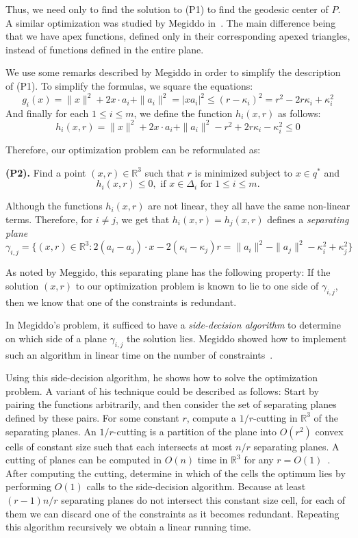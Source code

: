 \documentclass[a4paper,UKenglish]{lipics}
\begin{document}
Thus, we need only to find the solution to (P1) to find the geodesic center of $P$.
A similar optimization was studied by Megiddo in~\cite{megiddo1989ball}. 
The main difference being that we have apex functions, defined only in their corresponding apexed triangles, instead of functions defined in the entire plane. 

We use some remarks described by Megiddo in order to simplify the description of (P1).
To simplify the formulas, we square the equations:
$$g_i(x) = \|x\|^2 + 2x\cdot a_i + \|a_i\|^2  = |x a_i|^2 \leq (r - \kappa_i)^2 = r^2 - 2r\kappa_i + \kappa_i^2$$ 
And finally for each $1\leq i\leq m$, we define the function $h_i(x, r)$ as follows:
$$h_i(x, r) = \|x\|^2 + 2x\cdot a_i + \|a_i\|^2  - r^2 + 2r\kappa_i - \kappa_i^2 \leq 0$$

Therefore, our optimization problem can be reformulated as:

\textbf{(P2).} Find a point $(x,r)\in \mathbb{R}^3$ such that $r$ is minimized subject to $x\in q^*$ and 
$$h_i(x, r) \leq 0, \text{ if $x\in \Delta_{i}$ for $1\leq i \leq m$}.$$%

Although the functions $h_i(x,r)$ are not linear, they all have the same non-linear terms. Therefore, for $i\neq j$, we get that
$h_i(x,r) = h_j(x, r)$ defines a \emph{separating plane}
$$\gamma_{i,j} = \{(x, r) \in \mathbb{R}^3: 2 (a_i - a_j) \cdot x - 2( \kappa_i - \kappa_j) r = \|a_i\|^2 - \|a_j\|^2 - \kappa_i^2 + \kappa_j^2\}$$

As noted by Meggido, this separating plane has the following property:
If the solution $(x, r)$ to our optimization problem is known to lie to one side of $\gamma_{i,j}$, then we know that one of the constraints is redundant. 

In Megiddo's problem, it sufficed to have a \emph{side-decision algorithm} to determine on which side of a plane $\gamma_{i,j}$ the solution lies. Megiddo showed how to implement such an algorithm in linear time on the number of constraints~\cite{megiddo1989ball}.

Using this side-decision algorithm, he shows how to solve the optimization problem. A variant of his technique could be described as follows: Start by pairing the functions arbitrarily, and then consider the set of separating planes defined by these pairs.
For some constant $r$, compute a $1/r$-cutting in $\mathbb{R}^3$ of the separating planes.
An $1/r$-cutting is a partition of the plane into $O(r^2)$ convex cells of constant size such that each intersects at most $n/r$ separating planes.
A cutting of planes can be computed in $O(n)$ time in $\mathbb{R}^3$ for any $r = O(1)$~\cite{matousekCuttings}.
After computing the cutting, determine in which of the cells the optimum lies by performing $O(1)$ calls to the side-decision algorithm. 
Because at least $(r-1)n/r$ separating planes do not intersect this constant size cell, for each of them we can discard one of the constraints as it becomes redundant. Repeating this algorithm recursively we obtain a linear running time.
\end{document}
